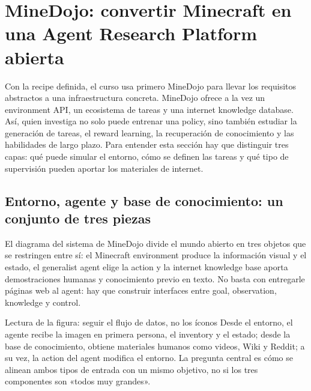 \section{MineDojo: convertir Minecraft en una Agent Research Platform abierta}

Con la recipe definida, el curso usa primero MineDojo para llevar los requisitos abstractos a una infraestructura concreta. MineDojo ofrece a la vez un environment API, un ecosistema de tareas y una internet knowledge database. Así, quien investiga no solo puede entrenar una policy, sino también estudiar la generación de tareas, el reward learning, la recuperación de conocimiento y las habilidades de largo plazo. Para entender esta sección hay que distinguir tres capas: qué puede simular el entorno, cómo se definen las tareas y qué tipo de supervisión pueden aportar los materiales de internet.

\subsection{Entorno, agente y base de conocimiento: un conjunto de tres piezas}

El diagrama del sistema de MineDojo divide el mundo abierto en tres objetos que se restringen entre sí: el Minecraft environment produce la información visual y el estado, el generalist agent elige la action y la internet knowledge base aporta demostraciones humanas y conocimiento previo en texto. No basta con entregarle páginas web al agent: hay que construir interfaces entre goal, observation, knowledge y control.


\begin{knowledgebox}{Lectura de la figura: seguir el flujo de datos, no los íconos}
Desde el entorno, el agente recibe la imagen en primera persona, el inventory y el estado; desde la base de conocimiento, obtiene materiales humanos como videos, Wiki y Reddit; a su vez, la action del agent modifica el entorno. La pregunta central es cómo se alinean ambos tipos de entrada con un mismo objetivo, no si los tres componentes son «todos muy grandes».
\end{knowledgebox}


